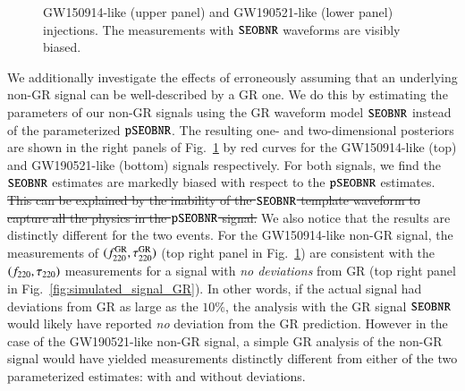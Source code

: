 \begin{figure}
\begin{center}
{GW150914-like (upper panel) and GW190521-like (lower panel) injections. The measurements with $\texttt{SEOBNR}$ waveforms are visibly biased.}
        \label{fig:simulated_signal_nonGR}
\end{center}
\end{figure}

We additionally investigate the effects of erroneously assuming that
an underlying non-GR signal can be well-described by a GR one. We do
this by estimating the parameters of our non-GR signals using the GR
waveform model $\texttt{SEOBNR}$ instead of the parameterized $\texttt{pSEOBNR}$.  The
resulting one- and two-dimensional posteriors are shown in the right
panels of Fig.~\ref{fig:simulated_signal_nonGR} by red curves for the
GW150914-like (top) and GW190521-like (bottom) signals
respectively. For both signals, we find the $\texttt{SEOBNR}$ estimates are
markedly biased with respect to the $\texttt{pSEOBNR}$ estimates. \sout{This can be
explained by the inability of the $\texttt{SEOBNR}$ template waveform to capture
all the physics in the $\texttt{pSEOBNR}$ signal.}  We also notice that the
results are distinctly different for the two events. For the
GW150914-like non-GR signal, the measurements of $(f ^{\text{GR}}_{\text{220}},
\tau ^{\text{GR}}_{\text{220}})$ (top right panel in
Fig.~\ref{fig:simulated_signal_nonGR}) are consistent with the
$(f_{\text{220}}, \tau_{\text{220}})$ measurements for a signal with \emph{no
  deviations} from GR (top right panel in
Fig.~\ref{fig:simulated_signal_GR}). In other words, if the actual
signal had deviations from GR as large as the $10\%$, the analysis
with the GR signal $\texttt{SEOBNR}$ would likely have reported \emph{no}
deviation from the GR prediction. However in the case of the
GW190521-like non-GR signal, a simple GR analysis of the non-GR signal
would have yielded measurements distinctly different from either of
the two parameterized estimates: with and without deviations.

